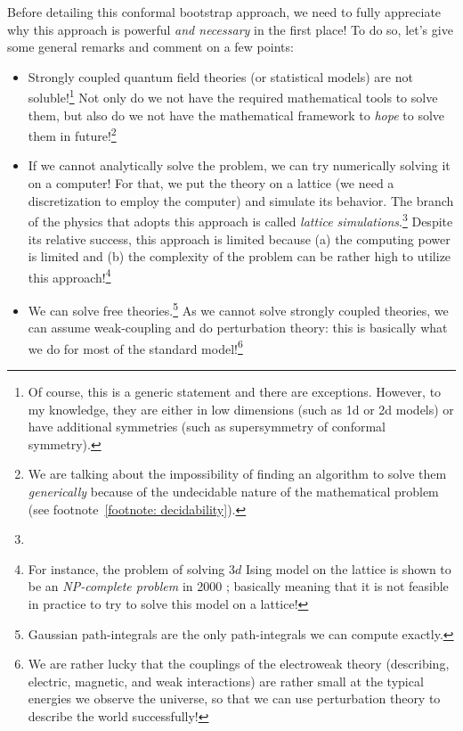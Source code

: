 Before detailing this conformal bootstrap approach, we need to fully appreciate why this approach is powerful \emph{and necessary} in the first place! To do so, let's give some general remarks and comment on a few points:
\begin{itemize}
	\label{items: problems with strongly coupled systems}
	\item Strongly coupled quantum field theories (or statistical models) are not soluble!\footnote{Of course, this is a generic statement and there are exceptions. However, to my knowledge, they are either in low dimensions (such as 1d or 2d models) or have additional symmetries (such as supersymmetry of conformal symmetry). } Not only do we not have the required mathematical tools to solve them, but also do we not have the mathematical framework to \emph{hope} to solve them in future!\footnote{We are talking about the impossibility of finding an algorithm to solve them \emph{generically} because of the undecidable nature of the mathematical problem (see footnote~\ref{footnote: decidability}).}
	
	
	\item If we cannot analytically solve the problem, we can try numerically solving it on a computer! For that, we put the theory on a lattice (we need a discretization to employ the computer) and simulate its behavior. The branch of the physics that adopts this approach is called \emph{lattice simulations}.\footnote{} Despite its relative success, this approach is limited because (a) the computing power is limited and (b) the complexity of the problem can be rather high to utilize this approach!\footnote{For instance, the problem of solving $3d$ Ising model on the lattice is shown to be an \emph{NP-complete problem} in 2000 \cite{istrail2000statistical}; basically meaning that it is not feasible in practice to try to solve this model on a lattice!}
	
	\item We can solve free theories.\footnote{Gaussian path-integrals are the only path-integrals we can compute exactly. } As we cannot solve strongly coupled theories, we can assume weak-coupling and do perturbation theory: this is basically what we do for most of the standard model!\footnote{We are rather lucky that the couplings of the electroweak theory (describing, electric, magnetic, and weak interactions) are rather small at the typical energies we observe the universe, so that we can use perturbation theory to describe the world successfully! }
	

\end{itemize}
